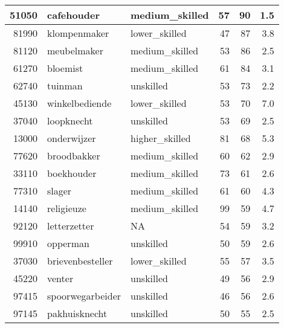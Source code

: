 \begin{table}
\begin{tabular}[t]{r|l|l|r|r|r}
\hline
51050 & cafehouder & medium\_skilled & 57 & 90 & 1.5\\
\hline
81990 & klompenmaker & lower\_skilled & 47 & 87 & 3.8\\
\hline
81120 & meubelmaker & medium\_skilled & 53 & 86 & 2.5\\
\hline
61270 & bloemist & medium\_skilled & 61 & 84 & 3.1\\
\hline
62740 & tuinman & unskilled & 53 & 73 & 2.2\\
\hline
45130 & winkelbediende & lower\_skilled & 53 & 70 & 7.0\\
\hline
37040 & loopknecht & unskilled & 53 & 69 & 2.5\\
\hline
13000 & onderwijzer & higher\_skilled & 81 & 68 & 5.3\\
\hline
77620 & broodbakker & medium\_skilled & 60 & 62 & 2.9\\
\hline
33110 & boekhouder & medium\_skilled & 73 & 61 & 2.6\\
\hline
77310 & slager & medium\_skilled & 61 & 60 & 4.3\\
\hline
14140 & religieuze & medium\_skilled & 99 & 59 & 4.7\\
\hline
92120 & letterzetter & NA & 54 & 59 & 3.2\\
\hline
99910 & opperman & unskilled & 50 & 59 & 2.6\\
\hline
37030 & brievenbesteller & lower\_skilled & 55 & 57 & 3.5\\
\hline
45220 & venter & unskilled & 49 & 56 & 2.9\\
\hline
97415 & spoorwegarbeider & unskilled & 46 & 56 & 2.6\\
\hline
97145 & pakhuisknecht & unskilled & 50 & 55 & 2.5\\
\hline
\end{tabular}
\end{table}
